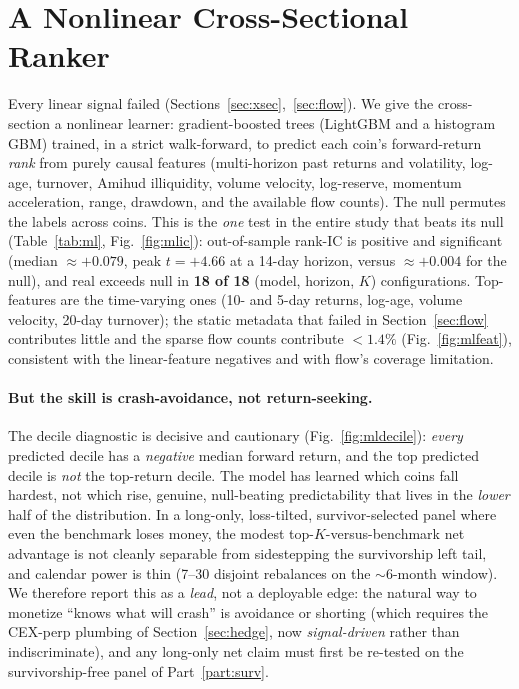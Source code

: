 \documentclass[12pt]{article}
\begin{document}
\section{A Nonlinear Cross-Sectional Ranker}\label{sec:ml}
Every linear signal failed (Sections~\ref{sec:xsec},~\ref{sec:flow}). We give the cross-section a nonlinear learner: gradient-boosted trees (LightGBM and a histogram GBM) trained, in a strict walk-forward, to predict each coin's forward-return \emph{rank} from purely causal features (multi-horizon past returns and volatility, log-age, turnover, Amihud illiquidity, volume velocity, log-reserve, momentum acceleration, range, drawdown, and the available flow counts). The null permutes the labels across coins. This is the \emph{one} test in the entire study that beats its null (Table~\ref{tab:ml}, Fig.~\ref{fig:mlic}): out-of-sample rank-IC is positive and significant (median $\approx+0.079$, peak $t=+4.66$ at a 14-day horizon, versus $\approx+0.004$ for the null), and real exceeds null in \textbf{18 of 18} (model, horizon, $K$) configurations. Top-features are the time-varying ones (10- and 5-day returns, log-age, volume velocity, 20-day turnover); the static metadata that failed in Section~\ref{sec:flow} contributes little and the sparse flow counts contribute $<1.4\%$ (Fig.~\ref{fig:mlfeat}), consistent with the linear-feature negatives and with flow's coverage limitation.

\paragraph{But the skill is crash-avoidance, not return-seeking.} The decile diagnostic is decisive and cautionary (Fig.~\ref{fig:mldecile}): \emph{every} predicted decile has a \emph{negative} median forward return, and the top predicted decile is \emph{not} the top-return decile. The model has learned which coins fall hardest, not which rise, genuine, null-beating predictability that lives in the \emph{lower} half of the distribution. In a long-only, loss-tilted, survivor-selected panel where even the benchmark loses money, the modest top-$K$-versus-benchmark net advantage is not cleanly separable from sidestepping the survivorship left tail, and calendar power is thin (7--30 disjoint rebalances on the $\sim$6-month window). We therefore report this as a \emph{lead}, not a deployable edge: the natural way to monetize ``knows what will crash'' is avoidance or shorting (which requires the CEX-perp plumbing of Section~\ref{sec:hedge}, now \emph{signal-driven} rather than indiscriminate), and any long-only net claim must first be re-tested on the survivorship-free panel of Part~\ref{part:surv}.
\end{document}
